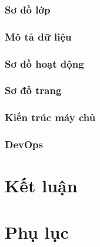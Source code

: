 \documentclass[11pt]{report}
\begin{document}
\subsection{Sơ đồ lớp}


\subsection{Mô tả dữ liệu}



\subsection{Sơ đồ hoạt động}


\subsection{Sơ đồ trang}


\subsection{Kiến trúc máy chủ}


\subsection{DevOps}




\chapter*{Kết luận	}
\blindtext




\chapter*{Phụ lục}
\blindtext
\end{document}
